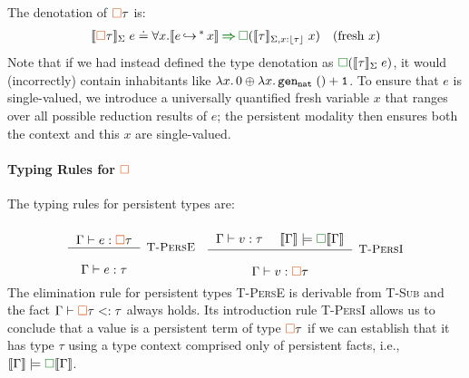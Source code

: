\begin{definition}
  The denotation of $\ctpers \tau$ is:
  \vspace{-0.2em}
  \begin{align*}
    \denot{\ctpers \tau}_\Sigma\;e \doteq \forall x.\denot{\mstep{e}{x}} \chimpl \chpers (\denot{\tau}_{\Sigma,x{:}\eraserf{\tau}}\;x) \quad (\text{fresh $x$})
  \end{align*}\noindent
  Note that if we had instead defined the type denotation as
  $\chpers (\denot{\tau}_{\Sigma}\;e)$, it would (incorrectly) contain
  inhabitants like
  $\lambda {x}.{\, 0} \oplus \lambda {x}.{\, {\tt gen_{nat} \;() + 1}}$. To
  ensure that $e$ is single-valued, we introduce a universally
  quantified fresh variable $x$ that ranges over all possible
  reduction results of $e$; the persistent modality then ensures both
  the context and this $x$ are single-valued.
\end{definition}

\paragraph{Typing Rules for $\ctpers$} The typing rules for persistent
types are:
\vspace{-0.2em}
\begin{align*}
\mprooftr{20mm}
      {$\Gamma \vdash e : \ctpers \tau$}
      {T-PersE}
      {$\Gamma \vdash e : \tau$}
\quad
  \mprooftr{40mm}
      {$\Gamma \vdash v : \tau$ \quad $\denot{\Gamma} \models \chpers \denot{\Gamma}$}
      {T-PersI}
      {$\Gamma \vdash v : \ctpers \tau$}
\end{align*}\noindent
The elimination rule for persistent types \textsc{T-PersE} is
derivable from \textsc{T-Sub} and the fact
$\Gamma \vdash \ctpers \tau <: \tau$ always holds.  Its introduction
rule \textsc{T-PersI} allows us to conclude that a value is a
persistent term of type $\ctpers \tau$ if we can establish that it has
type $\tau$ using a type context comprised only of persistent facts,
i.e., $\denot{\Gamma} \models \chpers \denot{\Gamma}$.



